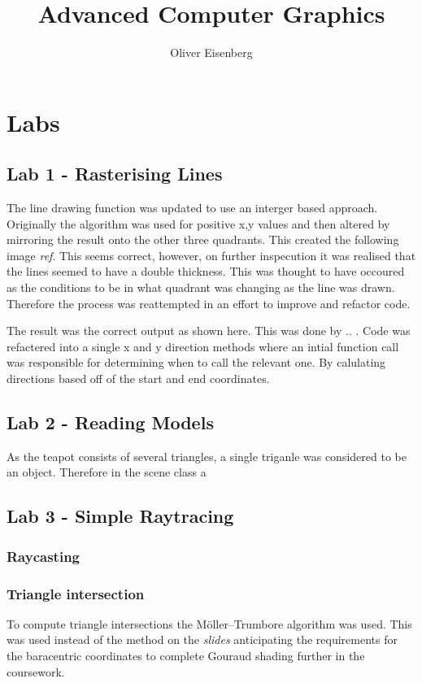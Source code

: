 \documentclass{article}
\begin{document}
\title{Advanced Computer Graphics}
\author{Oliver Eisenberg}
\maketitle
\pagebreak
\tableofcontents
\pagebreak
\twocolumn
\section{Labs}
\subsection{Lab 1 - Rasterising Lines}
The line drawing function was updated to use an interger based approach. Originally the algorithm was used for positive x,y values and then altered by mirroring the result onto the other three quadrants. This created the following image \textit{ref}. This seems correct, however, on further inspecution it was realised that the lines seemed to have a double thickness. This was thought to have occoured as the conditions to be in what quadrant was changing as the line was drawn. Therefore the process was reattempted in an effort to improve and refactor code.

The result was the correct output as shown here. This was done by .. . Code was refactered into a single x and y direction methods where an intial function call was responsible for determining when to call the relevant one. By calulating directions based off of the start and end coordinates.
\subsection{Lab 2 - Reading Models}
As the teapot consists of several triangles, a single triganle was considered to be an object. Therefore in the scene class a 
\subsection{Lab 3 - Simple Raytracing}
\subsubsection{Raycasting }
\subsubsection{Triangle intersection}
To compute triangle intersections the Möller–Trumbore algorithm was used. This was used instead of the method on the \textit{slides} anticipating the requirements for the baracentric coordinates to complete Gouraud shading further in the coursework.
\end{document}
